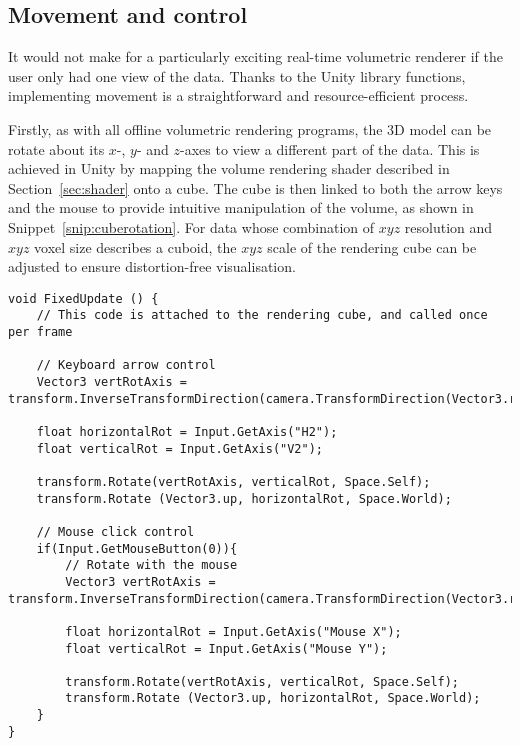 


\subsection{Movement and control}
It would not make for a particularly exciting real-time volumetric renderer if the user only had one view of the data.
Thanks to the Unity library functions, implementing movement is a straightforward and resource-efficient process.

Firstly, as with all offline volumetric rendering programs, the 3D model can be rotate about its $x$-, $y$- and $z$-axes to view a different part of the data.
This is achieved in Unity by mapping the volume rendering shader described in Section~\ref{sec:shader} onto a cube.
The cube is then linked to both the arrow keys and the mouse to provide intuitive manipulation of the volume, as shown in Snippet~\ref{snip:cuberotation}.
For data whose combination of $xyz$ resolution and $xyz$ voxel size describes a cuboid, the $xyz$ scale of the rendering cube can be adjusted to ensure distortion-free visualisation.

\begin{lstlisting}[language={[Sharp]c}, label={snip:cuberotation}, caption={C\# code using built-in Unity functions to rotate the rendered volumetric data.}]
void FixedUpdate () {
	// This code is attached to the rendering cube, and called once per frame

	// Keyboard arrow control
	Vector3 vertRotAxis = transform.InverseTransformDirection(camera.TransformDirection(Vector3.right)).normalized;

	float horizontalRot = Input.GetAxis("H2");
	float verticalRot = Input.GetAxis("V2");

	transform.Rotate(vertRotAxis, verticalRot, Space.Self);
	transform.Rotate (Vector3.up, horizontalRot, Space.World);

	// Mouse click control
	if(Input.GetMouseButton(0)){
		// Rotate with the mouse
		Vector3 vertRotAxis = transform.InverseTransformDirection(camera.TransformDirection(Vector3.right)).normalized;

		float horizontalRot = Input.GetAxis("Mouse X");
		float verticalRot = Input.GetAxis("Mouse Y");

		transform.Rotate(vertRotAxis, verticalRot, Space.Self);
		transform.Rotate (Vector3.up, horizontalRot, Space.World);
	}
}
\end{lstlisting}

